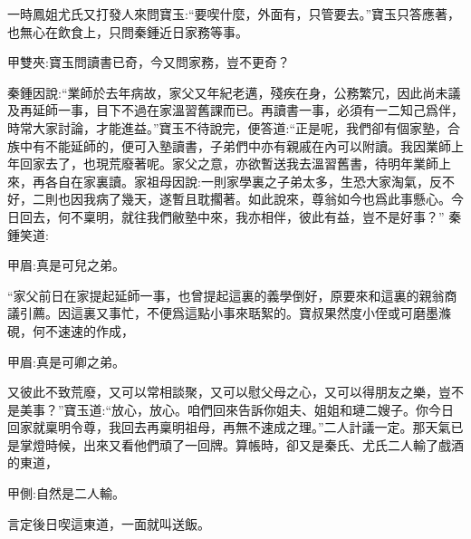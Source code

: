 \begin{parag}
    一時鳳姐尤氏又打發人來問寶玉:“要喫什麼，外面有，只管要去。”寶玉只答應著，也無心在飲食上，只問秦鍾近日家務等事。\begin{note}甲雙夾:寶玉問讀書已奇，今又問家務，豈不更奇？\end{note}秦鍾因說:“業師於去年病故，家父又年紀老邁，殘疾在身，公務繁冗，因此尚未議及再延師一事，目下不過在家溫習舊課而已。再讀書一事，必須有一二知己爲伴，時常大家討論，才能進益。”寶玉不待說完，便答道:“正是呢，我們卻有個家塾，合族中有不能延師的，便可入塾讀書，子弟們中亦有親戚在內可以附讀。我因業師上年回家去了，也現荒廢著呢。家父之意，亦欲暫送我去溫習舊書，待明年業師上來，再各自在家裏讀。家祖母因說:一則家學裏之子弟太多，生恐大家淘氣，反不好，二則也因我病了幾天，遂暫且耽擱著。如此說來，尊翁如今也爲此事懸心。今日回去，何不稟明，就往我們敝塾中來，我亦相伴，彼此有益，豈不是好事？” 秦鍾笑道:\begin{note}甲眉:真是可兒之弟。\end{note}“家父前日在家提起延師一事，也曾提起這裏的義學倒好，原要來和這裏的親翁商議引薦。因這裏又事忙，不便爲這點小事來聒絮的。寶叔果然度小侄或可磨墨滌硯，何不速速的作成，\begin{note}甲眉:真是可卿之弟。\end{note}又彼此不致荒廢，又可以常相談聚，又可以慰父母之心，又可以得朋友之樂，豈不是美事？”寶玉道:“放心，放心。咱們回來告訴你姐夫、姐姐和璉二嫂子。你今日回家就稟明令尊，我回去再稟明祖母，再無不速成之理。”二人計議一定。那天氣已是掌燈時候，出來又看他們頑了一回牌。算帳時，卻又是秦氏、尤氏二人輸了戲酒的東道，\begin{note}甲側:自然是二人輸。\end{note}言定後日喫這東道，一面就叫送飯。
\end{parag}


